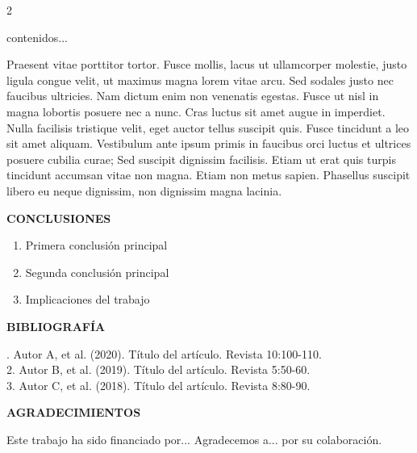 \documentclass[a0,portrait]{a0poster}
\newcommand{\apartado}[1]{%
    \noindent\fontsize{45pt}{45pt}\selectfont%
    \textcolor[rgb]{0,0,1}{\textbf{\uppercase{#1}}}%
}
\newcommand{\texto}[1]{%
    \fontsize{30pt}{30pt}\selectfont #1%
}
\newcommand{\textochico}[1]{%
    \fontsize{12pt}{24pt}\selectfont #1%
}
\begin{document}
\begin{multicols*}{2}
\begin{minipage}{\textwidth}
	contenidos...
\end{minipage}

Praesent vitae porttitor tortor. Fusce mollis, lacus ut ullamcorper molestie, justo ligula congue velit, ut maximus magna lorem vitae arcu. Sed sodales justo nec faucibus ultricies. Nam dictum enim non venenatis egestas. Fusce ut nisl in magna lobortis posuere nec a nunc. Cras luctus sit amet augue in imperdiet. Nulla facilisis tristique velit, eget auctor tellus suscipit quis. Fusce tincidunt a leo sit amet aliquam. Vestibulum ante ipsum primis in faucibus orci luctus et ultrices posuere cubilia curae; Sed suscipit dignissim facilisis. Etiam ut erat quis turpis tincidunt accumsan vitae non magna. Etiam non metus sapien. Phasellus suscipit libero eu neque dignissim, non dignissim magna lacinia.

\apartado{Conclusiones}

\texto{
\begin{enumerate}
    \item Primera conclusión principal
    \item Segunda conclusión principal
    \item Implicaciones del trabajo
\end{enumerate}
}

\apartado{Bibliografía}

\textochico{
1. Autor A, et al. (2020). Título del artículo. Revista 10:100-110.\\
2. Autor B, et al. (2019). Título del artículo. Revista 5:50-60.\\
3. Autor C, et al. (2018). Título del artículo. Revista 8:80-90.
}

\apartado{Agradecimientos}

\textochico{
Este trabajo ha sido financiado por... 
Agradecemos a... por su colaboración.
}

\end{multicols*}
\end{document}
